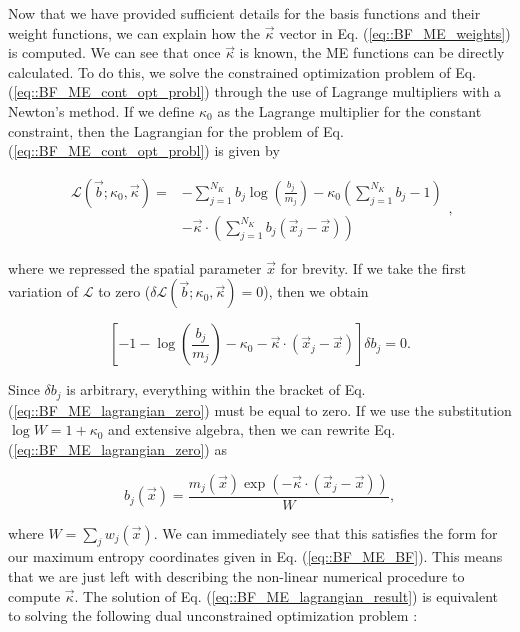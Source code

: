 Now that we have provided sufficient details for the basis functions and their weight functions, we can explain how the $\vec{\kappa}$ vector in Eq. (\ref{eq::BF_ME_weights}) is computed. We can see that once $\vec{\kappa}$ is known, the ME functions can be directly calculated. To do this, we solve the constrained optimization problem of Eq. (\ref{eq::BF_ME_cont_opt_probl}) through the use of Lagrange multipliers with a Newton's method. If we define $\kappa_0$ as the Lagrange multiplier for the constant constraint, then the Lagrangian for the problem of Eq. (\ref{eq::BF_ME_cont_opt_probl}) is given by

\begin{equation}
\label{eq::BF_ME_lagrangian}
\begin{aligned}
\mathcal{L} (\vec{b}; \kappa_0, \vec{\kappa} ) = &- \sum_{j=1}^{N_K} b_j \log \left(  \frac{b_j}{m_j} \right) - \kappa_0 \left(  \sum_{j=1}^{N_K} b_j - 1 \right) \\
&- \vec{\kappa} \cdot \left(  \sum_{j=1}^{N_K} b_j \left( \vec{x}_j - \vec{x} \right) \right)
\end{aligned} ,
\end{equation}

\noindent where we repressed the spatial parameter $\vec{x}$ for brevity. If we take the first variation of $\mathcal{L}$ to zero ($\delta \mathcal{L} (\vec{b}; \kappa_0, \vec{\kappa} ) = 0$), then we obtain

\begin{equation}
\label{eq::BF_ME_lagrangian_zero}
\left[ -1 - \log \left(  \frac{b_j}{m_j} \right) - \kappa_0 - \vec{\kappa} \cdot \left( \vec{x}_j - \vec{x} \right)  \right] \delta b_j = 0 .
\end{equation}

\noindent Since $\delta b_j $ is arbitrary, everything within the bracket of Eq. (\ref{eq::BF_ME_lagrangian_zero}) must be equal to zero. If we use the substitution $\log W= 1 + \kappa_0$ and extensive algebra, then we can rewrite Eq. (\ref{eq::BF_ME_lagrangian_zero}) as

\begin{equation}
\label{eq::BF_ME_lagrangian_result}
b_j (\vec{x}) = \frac{m_j(\vec{x}) \exp(-  \vec{\kappa} \cdot (\vec{x}_j - \vec{x}))}{W} ,
\end{equation}

\noindent where $W = \sum_j w_j (\vec{x})$. We can immediately see that this satisfies the form for our maximum entropy coordinates given in Eq. (\ref{eq::BF_ME_BF}). This means that we are just left with describing the non-linear numerical procedure to compute $\vec{\kappa}$. The solution of Eq. (\ref{eq::BF_ME_lagrangian_result}) is equivalent to solving the following dual unconstrained optimization problem \cite{boyd2004convex}:

